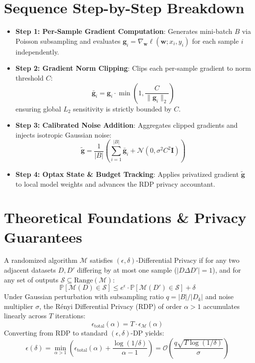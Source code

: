 \documentclass[11pt,a4paper,titlepage]{report}
\begin{document}
\section{Sequence Step-by-Step Breakdown}
\begin{itemize}[leftmargin=*]
    \item \textbf{Step 1: Per-Sample Gradient Computation}: Generates mini-batch $B$ via Poisson subsampling and evaluates $\mathbf{g}_i = \nabla_{\mathbf{w}} \ell(\mathbf{w}; x_i, y_i)$ for each sample $i$ independently.
    \item \textbf{Step 2: Gradient Norm Clipping}: Clips each per-sample gradient to norm threshold $C$:
    \begin{equation}
        \bar{\mathbf{g}}_i = \mathbf{g}_i \cdot \min\left(1, \frac{C}{\|\mathbf{g}_i\|_2}\right)
    \end{equation}
    ensuring global $L_2$ sensitivity is strictly bounded by $C$.
    \item \textbf{Step 3: Calibrated Noise Addition}: Aggregates clipped gradients and injects isotropic Gaussian noise:
    \begin{equation}
        \tilde{\mathbf{g}} = \frac{1}{|B|} \left( \sum_{i=1}^{|B|} \bar{\mathbf{g}}_i + \mathcal{N}\left(0, \sigma^2 C^2 \mathbf{I}\right) \right)
    \end{equation}
    \item \textbf{Step 4: Optax State \& Budget Tracking}: Applies privatized gradient $\tilde{\mathbf{g}}$ to local model weights and advances the RDP privacy accountant.
\end{itemize}

\section{Theoretical Foundations \& Privacy Guarantees}
\begin{mathfoundation}
A randomized algorithm $\mathcal{M}$ satisfies $(\epsilon, \delta)$-Differential Privacy if for any two adjacent datasets $D, D'$ differing by at most one sample ($|D \Delta D'| = 1$), and for any set of outputs $\mathcal{S} \subseteq \text{Range}(\mathcal{M})$:
\begin{equation}
    \mathbb{P}[\mathcal{M}(D) \in \mathcal{S}] \le e^\epsilon \cdot \mathbb{P}[\mathcal{M}(D') \in \mathcal{S}] + \delta
\end{equation}
Under Gaussian perturbation with subsampling ratio $q = |B|/|D_k|$ and noise multiplier $\sigma$, the Rényi Differential Privacy (RDP) of order $\alpha > 1$ accumulates linearly across $T$ iterations:
\begin{equation}
    \epsilon_{\text{total}}(\alpha) = T \cdot \epsilon_{\mathcal{M}}(\alpha)
\end{equation}
Converting from RDP to standard $(\epsilon, \delta)$-DP yields:
\begin{equation}
    \epsilon(\delta) = \min_{\alpha > 1} \left( \epsilon_{\text{total}}(\alpha) + \frac{\log(1/\delta)}{\alpha - 1} \right) = \mathcal{O}\left( \frac{q \sqrt{T \log(1/\delta)}}{\sigma} \right)
\end{equation}
\end{mathfoundation}
\end{document}
